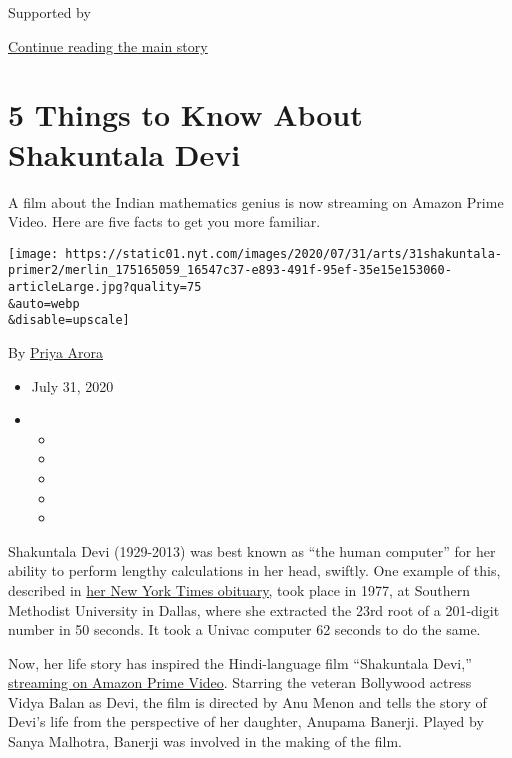 Supported by

\protect\hyperlink{after-sponsor}{Continue reading the main story}

\hypertarget{5-things-to-know-about-shakuntala-devi}{%
\section{5 Things to Know About Shakuntala
Devi}\label{5-things-to-know-about-shakuntala-devi}}

A film about the Indian mathematics genius is now streaming on Amazon
Prime Video. Here are five facts to get you more familiar.

\texttt{[image: https://static01.nyt.com/images/2020/07/31/arts/31shakuntala-primer2/merlin\_175165059\_16547c37-e893-491f-95ef-35e15e153060-articleLarge.jpg?quality=75\\\&auto=webp\\\&disable=upscale]}

By \href{https://www.nytimes.com/by/priya-arora}{Priya Arora}

\begin{itemize}
\item
  July 31, 2020
\item
  \begin{itemize}
  \item
  \item
  \item
  \item
  \item
  \end{itemize}
\end{itemize}

Shakuntala Devi (1929-2013) was best known as ``the human computer'' for
her ability to perform lengthy calculations in her head, swiftly. One
example of this, described in
\href{https://www.nytimes.com/2013/04/24/world/asia/shakuntala-devi-human-computer-dies-in-india-at-83.html}{her
New York Times obituary,} took place in 1977, at Southern Methodist
University in Dallas, where she extracted the 23rd root of a 201-digit
number in 50 seconds. It took a Univac computer 62 seconds to do the
same.

Now, her life story has inspired the Hindi-language film ``Shakuntala
Devi,''
\href{https://www.amazon.com/gp/video/detail/B08D71WWXD/ref=atv_dl_rdr?autoplay=1}{streaming
on Amazon Prime Video}. Starring the veteran Bollywood actress Vidya
Balan as Devi, the film is directed by Anu Menon and tells the story of
Devi's life from the perspective of her daughter, Anupama Banerji.
Played by Sanya Malhotra, Banerji was involved in the making of the
film.


